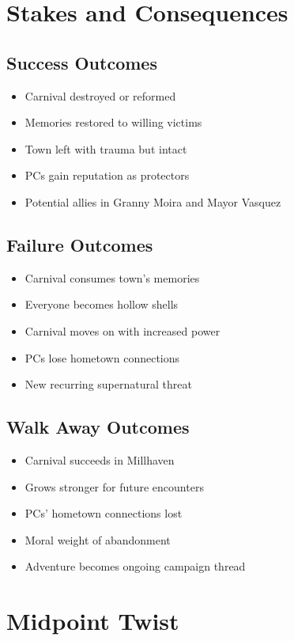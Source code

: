 \documentclass[11pt]{article}
\begin{document}
\section{Stakes and Consequences}

\subsection{Success Outcomes}
\begin{itemize}
\item Carnival destroyed or reformed
\item Memories restored to willing victims
\item Town left with trauma but intact
\item PCs gain reputation as protectors
\item Potential allies in Granny Moira and Mayor Vasquez
\end{itemize}

\subsection{Failure Outcomes}
\begin{itemize}
\item Carnival consumes town's memories
\item Everyone becomes hollow shells
\item Carnival moves on with increased power
\item PCs lose hometown connections
\item New recurring supernatural threat
\end{itemize}

\subsection{Walk Away Outcomes}
\begin{itemize}
\item Carnival succeeds in Millhaven
\item Grows stronger for future encounters
\item PCs' hometown connections lost
\item Moral weight of abandonment
\item Adventure becomes ongoing campaign thread
\end{itemize}

\section{Midpoint Twist}
\end{document}
